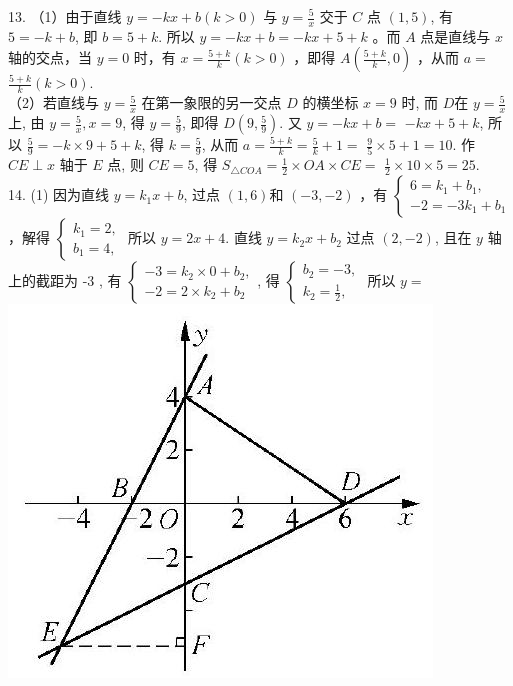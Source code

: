 \documentclass[10pt]{article}
\begin{document}
13. （1）由于直线 $y=-k x+b(k>0)$ 与 $y=\frac{5}{x}$ 交于 $C$ 点 $(1,5)$, 有 $5=-k+b$, 即 $b=5+k$. 所以 $y=-k x+b=-k x+5+k$ 。而 $A$ 点是直线与 $x$ 轴的交点，当 $y=0$ 时，有 $x=\frac{5+k}{k}(k>0)$ ，即得 $A\left(\frac{5+k}{k}, 0\right)$ ，从而 $a=$ $\frac{5+k}{k}(k>0)$.\\
（2）若直线与 $y=\frac{5}{x}$ 在第一象限的另一交点 $D$ 的横坐标 $x=9$ 时, 而 $D$在 $y=\frac{5}{x}$ 上, 由 $y=\frac{5}{x}, x=9$, 得 $y=\frac{5}{9}$, 即得 $D\left(9, \frac{5}{9}\right)$. 又 $y=-k x+b=$ $-k x+5+k$, 所以 $\frac{5}{9}=-k \times 9+5+k$, 得 $k=\frac{5}{9}$, 从而 $a=\frac{5+k}{k}=\frac{5}{k}+1=$ $\frac{9}{5} \times 5+1=10$. 作 $C E \perp x$ 轴于 $E$ 点, 则 $C E=5$, 得 $S_{\triangle C O A}=\frac{1}{2} \times O A \times C E=$ $\frac{1}{2} \times 10 \times 5=25$.\\
14. (1) 因为直线 $y=k_{1} x+b$, 过点 $(1,6)$和 $(-3,-2)$ ，有 $\left\{\begin{array}{l}6=k_{1}+b_{1}, \\ -2=-3 k_{1}+b_{1}\end{array}\right.$ ，解得 $\left\{\begin{array}{l}k_{1}=2, \\ b_{1}=4,\end{array}\right.$ 所以 $y=2 x+4$. 直线 $y=k_{2} x+b_{2}$ 过点 $(2,-2)$, 且在 $y$ 轴上的截距为 -3 , 有 $\left\{\begin{array}{l}-3=k_{2} \times 0+b_{2}, \\ -2=2 \times k_{2}+b_{2}\end{array}\right.$, 得 $\left\{\begin{array}{l}b_{2}=-3, \\ k_{2}=\frac{1}{2},\end{array}\right.$ 所以 $y=$\\
\includegraphics[max width=\textwidth, center]{2024_10_30_1bf34f7aeb61f11d11d3g-110}\\
\end{document}
